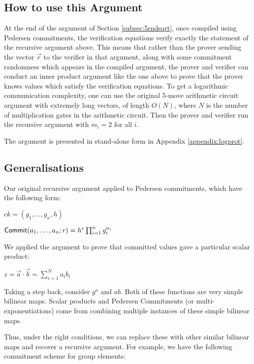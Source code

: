 \subsection{How to use this Argument}

At the end of the argument of Section \ref{subsec:5rndsqrt}, once compiled using Pedersen commitments, the verification equations verify exactly the statement of the recursive argument above. This means that rather than the prover sending the vector $\vec{r}$ to the verifier in that argument, along with some commitment randomness which appears in the compiled argument, the prover and verifier can conduct an inner product argument like the one above to prove that the prover knows values which satisfy the verification equations. To get a logarithmic communication complexity, one can use the original 5-move arithmetic circuit argument with extremely long vectors, of length $O(N)$, where $N$ is the number of multiplication gates in the arithmetic circuit. Then the prover and verifier run the recursive argument with $m_i = 2$ for all $i$.

The argument is presented in stand-alone form in Appendix \ref{appendix:logprot}.
\subsection{Generalisations}

Our original recursive argument applied to Pedersen commitments, which have the following form:

$ck = (g_1,\ldots,g_n,h)$

$ \mathsf{Commit} (a_1,\ldots,a_n;r) = h^r \prod_{i=1}^n g_i^{a_i}$

We applied the argument to prove that committed values gave a particular scalar product:

$z = \vec{a} \cdot \vec{b} = \sum_{i=1}^N a_i b_i$

Taking a step back, consider $g^a$ and $ab$. Both of these functions are very simple bilinear maps. Scalar products and Pedersen Commitments (or multi-exponentiations) come from combining multiple instances of these simple bilinear maps.

Thus, under the right conditions, we can replace these with other similar bilinear maps and recover a recursive argument. For example, we have the following commitment scheme for group elements:

